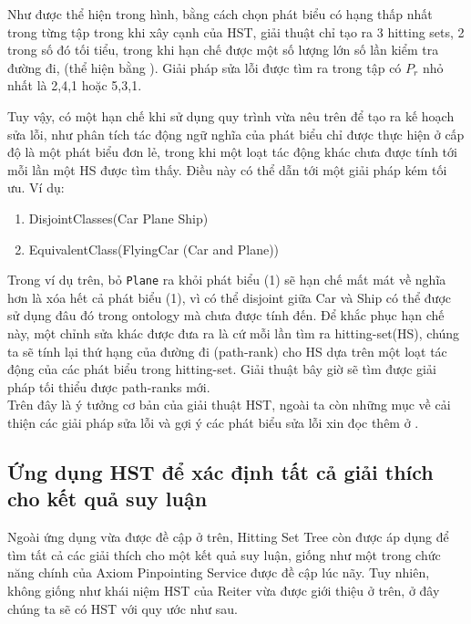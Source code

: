 	\hspace*{.05\textwidth} Như được thể hiện trong hình, bằng cách chọn phát biểu có hạng thấp nhất trong từng tập trong khi xây cạnh của HST, giải thuật chỉ tạo ra 3 hitting sets, 2 trong số đó tối tiểu, trong khi hạn chế được một số lượng lớn số lần kiểm tra đường đi, (thể hiện bằng \xmark). Giải pháp sửa lỗi được tìm ra trong tập có $P_{r}$ nhỏ nhất là {2,4,1} hoặc {5,3,1}.
	
	\hspace*{.05\textwidth} Tuy vậy, có một hạn chế khi sử dụng quy trình vừa nêu trên để tạo ra kế hoạch sửa lỗi, như phân tích tác động ngữ nghĩa của phát biểu chỉ được thực hiện ở cấp độ là một phát biểu đơn lẻ, trong khi một loạt tác động khác chưa được tính tới mỗi lần một HS được tìm thấy. Điều này có thể dẫn tới một giải pháp kém tối ưu. Ví dụ:
	\begin{enumerate}
		\item	DisjointClasses(Car Plane Ship)
		\item	EquivalentClass(FlyingCar (Car and Plane))			
	\end{enumerate}
	Trong ví dụ trên, bỏ \texttt{Plane} ra khỏi phát biểu (1) sẽ hạn chế mất mát về nghĩa hơn là xóa hết cả phát biểu (1), vì có thể disjoint giữa Car và Ship có thể được sử dụng đâu đó trong ontology mà chưa được tính đến.
	\hspace*{.05\textwidth} Để khắc phục hạn chế này, một chỉnh sửa khác được đưa ra là cứ mỗi lần tìm ra hitting-set(HS), chúng ta sẽ tính lại thứ hạng của đường đi (path-rank) cho HS dựa trên một loạt tác động của các phát biểu trong hitting-set. Giải thuật bây giờ sẽ tìm được giải pháp tối thiểu được path-ranks mới.
	\\
	Trên đây là ý tưởng cơ bản của giải thuật HST, ngoài ta còn những mục về cải thiện các giải pháp sửa lỗi và gợi ý các phát biểu sửa lỗi xin đọc thêm ở \cite{repair}.
	
\subsection{Ứng dụng HST để xác định tất cả giải thích cho kết quả suy luận\cite{matt_horridge}}
Ngoài ứng dụng vừa được đề cập ở trên, Hitting Set Tree còn được áp dụng để tìm tất cả các giải thích cho một kết quả suy luận, giống như một trong chức năng chính của Axiom Pinpointing Service được đề cập lúc nãy. Tuy nhiên, không giống như khái niệm HST của Reiter vừa được giới thiệu ở trên, ở đây chúng ta sẽ có HST với quy ước như sau.

